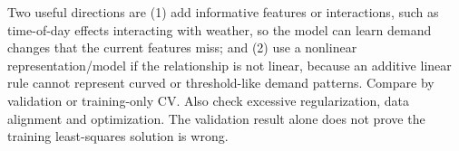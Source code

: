 Two useful directions are (1) add informative features or interactions, such as time-of-day effects interacting with weather, so the model can learn demand changes that the current features miss; and (2) use a nonlinear representation/model if the relationship is not linear, because an additive linear rule cannot represent curved or threshold-like demand patterns. Compare by validation or training-only CV. Also check excessive regularization, data alignment and optimization. The validation result alone does not prove the training least-squares solution is wrong.
